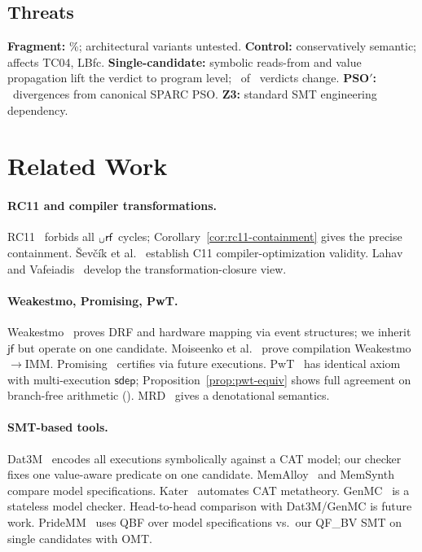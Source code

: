 \documentclass{llncs}
\newcommand{\sdep}{\mathsf{sdep}}
\newcommand{\rf}{\mathsf{rf}}
\newcommand{\jf}{\mathsf{jf}}
\begin{document}
\subsection{Threats}
\label{sec:threats}

\textbf{Fragment:} \CoveragePercent\%; architectural variants untested.
\textbf{Control:} conservatively semantic; affects TC04, LBfc.
\textbf{Single-candidate:} symbolic reads-from and value propagation lift the
verdict to program level; \SymbolicVerdictChanges~of \SymbolicCorpusTests~verdicts change.
\textbf{PSO$'$:} \PsoCanonicalDivergences~divergences from canonical SPARC PSO.
\textbf{Z3:} standard SMT engineering dependency.

\section{Related Work}
\label{sec:related}

\paragraph{RC11 and compiler transformations.}
RC11~\cite{lahav2017repairing} forbids all $\sb \cup \rf$ cycles;
Corollary~\ref{cor:rc11-containment} gives the precise containment.
Ševčík et al.~\cite{sevcik2011c11comp} establish C11 compiler-optimization
validity. Lahav and Vafeiadis~\cite{lahav2016fm} develop the
transformation-closure view.

\paragraph{Weakestmo, Promising, PwT.}
Weakestmo~\cite{chakraborty2019grounding} proves DRF and hardware mapping via
event structures; we inherit $\jf$ but operate on one candidate.
Moiseenko et al.~\cite{moiseenko2020compilation} prove compilation
Weakestmo$\to$IMM. Promising~\cite{kang2017promising} certifies via future
executions. PwT~\cite{jeffrey2022leaky} has identical axiom with
multi-execution $\sdep$; Proposition~\ref{prop:pwt-equiv} shows full
agreement on branch-free arithmetic (\PwtAgreement). MRD~\cite{paviotti2020mrd}
gives a denotational semantics.

\paragraph{SMT-based tools.}
Dat3M~\cite{gavrilenko2019bmc} encodes all executions symbolically against
a CAT model; our checker fixes one value-aware predicate on one candidate.
MemAlloy~\cite{wickerson2017memalloy} and MemSynth~\cite{bornholt2017memsynth}
compare model specifications. Kater~\cite{kater2023} automates CAT
metatheory. GenMC~\cite{kokologiannakis2019genmc} is a stateless model
checker. Head-to-head comparison with Dat3M/GenMC is future work.
PrideMM~\cite{cooksey2019pridemm} uses QBF over model specifications vs.\
our QF\_BV SMT on single candidates with OMT.
\end{document}
